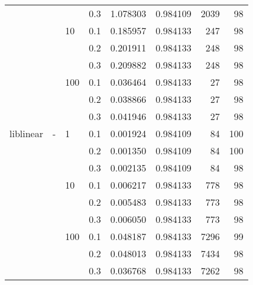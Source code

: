 \begin{table}[H]
\begin{tabular}{llllrrrr}
          &   &     & 0.3 &  1.078303 &  0.984109 &    2039 &    98 \\
          &   & 10  & 0.1 &  0.185957 &  0.984133 &     247 &    98 \\
          &   &     & 0.2 &  0.201911 &  0.984133 &     248 &    98 \\
          &   &     & 0.3 &  0.209882 &  0.984133 &     248 &    98 \\
          &   & 100 & 0.1 &  0.036464 &  0.984133 &      27 &    98 \\
          &   &     & 0.2 &  0.038866 &  0.984133 &      27 &    98 \\
          &   &     & 0.3 &  0.041946 &  0.984133 &      27 &    98 \\
liblinear & - & 1   & 0.1 &  0.001924 &  0.984109 &      84 &   100 \\
          &   &     & 0.2 &  0.001350 &  0.984109 &      84 &   100 \\
          &   &     & 0.3 &  0.002135 &  0.984109 &      84 &    98 \\
          &   & 10  & 0.1 &  0.006217 &  0.984133 &     778 &    98 \\
          &   &     & 0.2 &  0.005483 &  0.984133 &     773 &    98 \\
          &   &     & 0.3 &  0.006050 &  0.984133 &     773 &    98 \\
          &   & 100 & 0.1 &  0.048187 &  0.984133 &    7296 &    99 \\
          &   &     & 0.2 &  0.048013 &  0.984133 &    7434 &    98 \\
          &   &     & 0.3 &  0.036768 &  0.984133 &    7262 &    98 \\
\bottomrule
\end{tabular}
\end{table}
